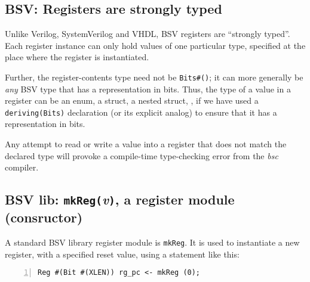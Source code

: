 
\subsection{BSV: Registers are strongly typed}


Unlike Verilog, SystemVerilog and VHDL, BSV registers are ``strongly
typed''.  Each register instance can only hold values of one
particular type, specified at the place where the register is
instantiated.

Further, the register-contents type need not be \verb|Bits#()|; it can
more generally be \emph{any} BSV type that has a representation in
bits.  Thus, the type of a value in a register can be an enum, a
struct, a nested struct, {\etc}, if we have used a
\verb|deriving(Bits)| declaration (or its explicit analog) to ensure
that it has a representation in bits.

Any attempt to read or write a value into a register that does not
match the declared type will provoke a compile-time type-checking
error from the \emph{bsc} compiler.


\subsection{BSV lib: {\tt mkReg(}\emph{v}{\tt )}, a register module (consructor)}




A standard BSV library register module is \verb|mkReg|.  It is used to
instantiate a new register, with a specified reset value, using a
statement like this:


{\small
\begin{Verbatim}[frame=single, numbers=left]
    Reg #(Bit #(XLEN)) rg_pc <- mkReg (0);
\end{Verbatim}
}

